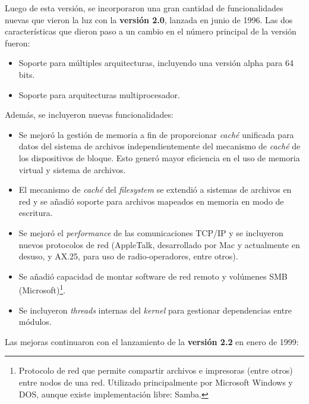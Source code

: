 \documentclass[spanish]{article}
\begin{document}
Luego de esta versión, se incorporaron una gran cantidad de funcionalidades nuevas que vieron la luz con la \textbf{versión 2.0}, lanzada en junio de 1996. Las dos características que dieron paso a un cambio en el número principal de la versión fueron:
\begin{itemize}
	\item Soporte para múltiples arquitecturas, incluyendo una versión alpha para 64 bits.
	\item Soporte para arquitecturas multiprocesador. 
\end{itemize}
Además, se incluyeron nuevas funcionalidades:
\begin{itemize}
	\item Se mejoró la gestión de memoria a fin de proporcionar \textit{caché} unificada para datos del sistema de archivos independientemente del mecanismo de \textit{caché} de los dispositivos de bloque. Esto generó mayor eficiencia en el uso de memoria virtual y sistema de archivos.
	\item El mecanismo de \textit{caché} del \textit{filesystem} se extendió a sistemas de archivos en red y se añadió soporte para archivos mapeados en memoria en modo de escritura. 
	\item Se mejoró el \textit{performance} de las comunicaciones TCP/IP y se incluyeron nuevos protocolos de red (AppleTalk, desarrollado por Mac y actualmente en desuso, y AX.25, para uso de radio-operadores, entre otros).
	\item Se añadió capacidad de montar software de red remoto y volúmenes SMB (Microsoft)\footnote{Protocolo de red que permite compartir archivos e impresoras (entre otros) entre nodos de una red. Utilizado principalmente por Microsoft Windows y DOS, aunque existe implementación libre: Samba.}. 
	\item Se incluyeron \textit{threads} internas del \textit{kernel} para gestionar dependencias entre módulos.
\end{itemize}
Las mejoras continuaron con el lanzamiento de la \textbf{versión 2.2} en enero de 1999:
\end{document}
